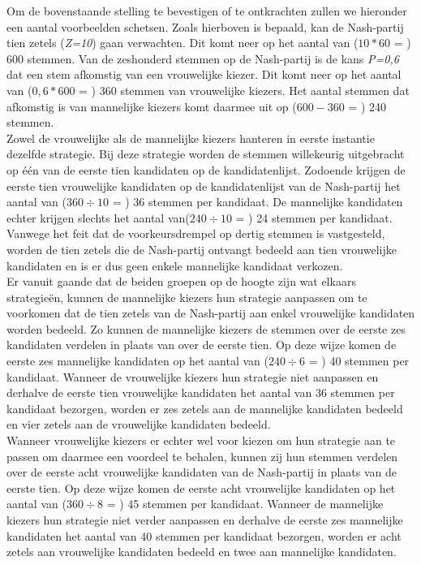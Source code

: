 Om de bovenstaande stelling te bevestigen of te ontkrachten zullen we hieronder een aantal voorbeelden schetsen. Zoals hierboven is bepaald, kan de Nash-partij tien zetels (\textit{Z=10}) gaan verwachten. Dit komt neer op het aantal van ($10*60$ = ) 600 stemmen. Van de zeshonderd stemmen op de Nash-partij is de kans \textit{P=0,6} dat een stem afkomstig van een vrouwelijke kiezer. Dit komt neer op het aantal van ($0,6*600$ = ) 360 stemmen van vrouwelijke kiezers. Het aantal stemmen dat afkomstig is van mannelijke kiezers komt daarmee uit op ($600-360$ = ) 240 stemmen. \\
\indent Zowel de vrouwelijke als de mannelijke kiezers hanteren in eerste instantie dezelfde strategie. Bij deze strategie worden de stemmen willekeurig uitgebracht op één van de eerste tien kandidaten op de kandidatenlijst. Zodoende krijgen de eerste tien vrouwelijke kandidaten op de kandidatenlijst van de Nash-partij het aantal van ($360\div10$ = ) 36 stemmen per kandidaat. De mannelijke kandidaten echter krijgen slechts het aantal van($240\div10$ = ) 24 stemmen per kandidaat. Vanwege het feit dat de voorkeursdrempel op dertig stemmen is vastgesteld, worden de tien zetels die de Nash-partij ontvangt bedeeld aan tien vrouwelijke kandidaten en is er dus geen enkele mannelijke kandidaat verkozen.\\ 
\indent Er vanuit gaande dat de beiden groepen op de hoogte zijn wat elkaars strategie\"{e}n, kunnen de mannelijke kiezers hun strategie aanpassen om te voorkomen dat de tien zetels van de Nash-partij aan enkel vrouwelijke kandidaten worden bedeeld. Zo kunnen de mannelijke kiezers de stemmen over de eerste zes kandidaten verdelen in plaats van over de eerste tien. Op deze wijze komen de eerste zes mannelijke kandidaten op het aantal van ($240\div6$ = ) 40 stemmen per kandidaat. Wanneer de vrouwelijke kiezers hun strategie niet aanpassen en derhalve de eerste tien vrouwelijke kandidaten het aantal van 36 stemmen per kandidaat bezorgen, worden er zes zetels aan de mannelijke kandidaten bedeeld en vier zetels aan de vrouwelijke kandidaten bedeeld. \\
\indent Wanneer vrouwelijke kiezers er echter wel voor kiezen om hun strategie aan te passen om daarmee een voordeel te behalen, kunnen zij hun stemmen verdelen over de eerste acht vrouwelijke kandidaten van de Nash-partij in plaats van de eerste tien. Op deze wijze komen de eerste acht vrouwelijke kandidaten op het aantal van ($360\div8$ = ) 45 stemmen per kandidaat. Wanneer de mannelijke kiezers hun strategie niet verder aanpassen en derhalve de eerste zes mannelijke kandidaten het aantal van 40 stemmen per kandidaat bezorgen, worden er acht zetels aan vrouwelijke kandidaten bedeeld en twee aan mannelijke kandidaten. \\

